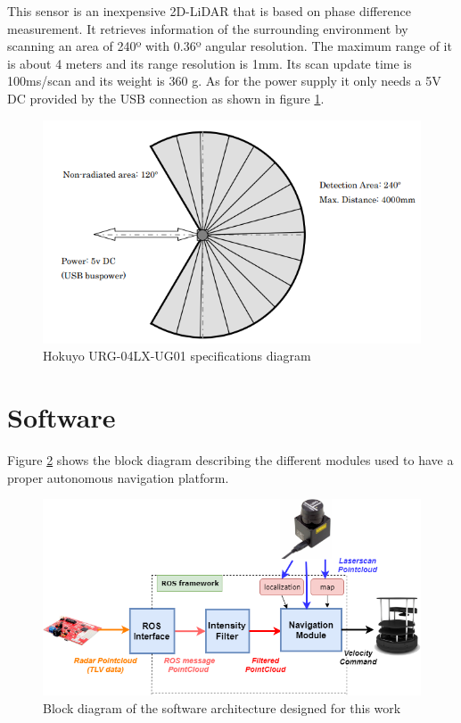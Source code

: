 This sensor is an inexpensive 2D-\ac{LiDAR} that is based on phase difference measurement. It retrieves information of the surrounding environment by scanning an area of 240º with 0.36º angular resolution. The maximum range of it is about 4 meters and its range resolution is 1mm. Its scan update time is 100ms/scan and its weight is 360 g.  As for the power supply it only needs a 5V DC provided by the USB connection as shown in figure \ref{fig::lidarS}.

\begin{figure}[ht!] 
\centerline{\includegraphics [width=0.6 \textwidth]{imgs/chapter4/lidarS.png}}
\caption{Hokuyo URG-04LX-UG01 specifications diagram}
\label{fig::lidarS}
\end{figure}

\section{Software}
Figure \ref{fig::softsetup} shows the block diagram describing  the different modules used to have a proper autonomous navigation platform.
\begin{figure}[h] 
\centerline{\includegraphics [width=0.9 \textwidth]{imgs/chapter4/bd.png}}
\caption{Block diagram of the software architecture designed for this work}
\label{fig::softsetup}
\end{figure}

